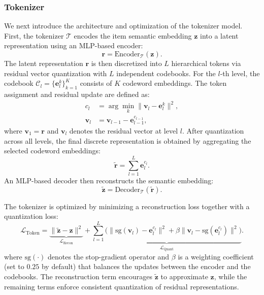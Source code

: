 \subsubsection{Tokenizer}
We next introduce the architecture and optimization of the tokenizer model. First, the tokenizer $\mathcal{T}$ encodes the item semantic embedding $\bm{z}$ into a latent representation using an MLP-based encoder:
\begin{equation}
\bm{r} = \text{Encoder}_{\mathcal{T}}(\bm{z}).
\end{equation}
The latent representation $\bm{r}$ is then discretized into $L$ hierarchical tokens via residual vector quantization with $L$ independent codebooks. For the $l$-th level, the codebook $\bm{\mathcal{C}}_l = \{\bm{e}_l^k\}_{k=1}^{K}$ consists of $K$ codeword embeddings. The token assignment and residual update are defined as:
\begin{align}\label{eq:assgin}
c_l &= \arg\min_k \lVert \bm{v}_l - \bm{e}_l^k \rVert^2, \\
\bm{v}_l &= \bm{v}_{l-1} - \bm{e}_{l-1}^{c_{l-1}},
\end{align}
where $\bm{v}_1 = \bm{r}$ and $\bm{v}_l$ denotes the residual vector at level $l$.
After quantization across all levels, the final discrete representation is obtained by aggregating the selected codeword embeddings:
\begin{equation}
\tilde{\bm{r}} = \sum_{l=1}^{L} \bm{e}_l^{c_l}.
\end{equation}
An MLP-based decoder then reconstructs the semantic embedding:
\begin{equation}
\tilde{\bm{z}} = \text{Decoder}_{\mathcal{T}}(\tilde{\bm{r}}).
\end{equation}

The tokenizer is optimized by minimizing a reconstruction loss together with a quantization loss:
\begin{equation}\label{eq:rqvae_loss}
\mathcal{L}_\text{Token} =
\underbrace{\lVert \tilde{\bm{z}} - \bm{z} \rVert^2}_{\mathcal{L}_\text{Recon}}
+ \underbrace{\sum_{l=1}^{L} \Big(
\lVert \text{sg}(\bm{v}_l) - \bm{e}_l^{c_l} \rVert^2
+ \beta \lVert \bm{v}_l - \text{sg}(\bm{e}_l^{c_l}) \rVert^2
\Big)}_{\mathcal{L}_\text{Quant}}.
\end{equation}
where $\text{sg}(\cdot)$ denotes the stop-gradient operator and $\beta$ is a weighting coefficient (set to $0.25$ by default) that balances the updates between the encoder and the codebooks. The reconstruction term encourages $\tilde{\bm{z}}$ to approximate $\bm{z}$, while the remaining terms enforce consistent quantization of residual representations.

